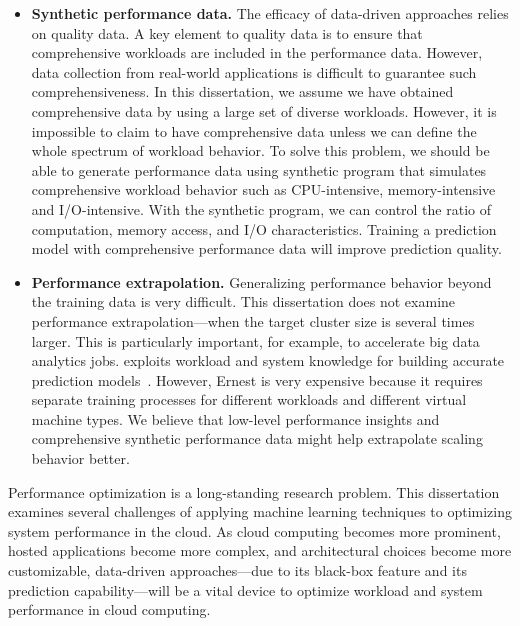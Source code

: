 \begin{itemize}

\item \textbf{Synthetic performance data.}
The efficacy of data-driven approaches relies on quality data.
A key element to quality data is to ensure that comprehensive workloads
are included in the performance data.
However, data collection from real-world applications is difficult
to guarantee such comprehensiveness.
In this dissertation, we assume we have obtained comprehensive data
by using a large set of diverse workloads.
However, it is impossible to claim to have comprehensive data
unless we can define the whole spectrum of workload behavior.
To solve this problem, we should be able to generate performance data
using synthetic program that simulates comprehensive workload behavior
such as CPU-intensive, memory-intensive and I/O-intensive.
With the synthetic program, we can control the ratio of
computation, memory access, and I/O characteristics.
Training a prediction model with comprehensive performance data will
improve prediction quality.


\item \textbf{Performance extrapolation.}
Generalizing performance behavior beyond the training data is very difficult.
This dissertation does not examine performance extrapolation---when
the target cluster size is several times larger.
This is particularly important, for example, to accelerate
big data analytics jobs.
\ernest exploits workload and system knowledge
for building accurate prediction models~\cite{Venkataraman2016}.
However, Ernest is very expensive because it requires separate training
processes for different workloads and different virtual machine types.
We believe that low-level performance insights and comprehensive synthetic performance data
might help extrapolate scaling behavior better.



\end{itemize}

Performance optimization is a long-standing research problem.
This dissertation examines several challenges of
applying machine learning techniques to
optimizing system performance in the cloud.
As cloud computing becomes more prominent,
hosted applications become more complex, and
architectural choices become more customizable,
data-driven approaches---due to
its black-box feature and its prediction capability---will be
a vital device to optimize workload and system performance in cloud computing.
